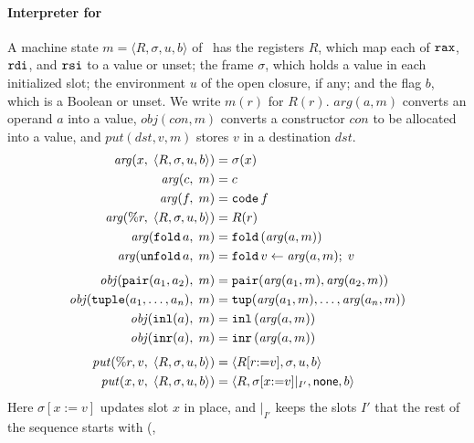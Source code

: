 \paragraph{Interpreter for \instr}

A machine state $m = \langle R, \sigma, u, b\rangle$ of \instr\ has
the registers $R$, which map each of $\mathtt{rax}$, $\mathtt{rdi}$, and
$\mathtt{rsi}$ to a value or unset; the frame $\sigma$, which holds a value
in each initialized slot; the environment $u$ of the open closure,
if any; and the flag $b$, which is a Boolean or unset. We write $m(r)$
for $R(r)$. $\mathit{arg}(a, m)$ converts an operand $a$ into a
value, $\mathit{obj}(\mathit{con}, m)$ converts a constructor $\mathit{con}$ to be allocated
into a value, and $\mathit{put}(\mathit{dst}, v, m)$ stores $v$ in a destination
$\mathit{dst}$.
\begin{align*}
  \mathit{arg}(x,\; \langle R, \sigma, u, b\rangle) &= \sigma(x) \\
  \mathit{arg}(c,\; m) &= c \\
  \mathit{arg}(f,\; m) &= \mathtt{code}\,f \\
  \mathit{arg}(\%r,\; \langle R, \sigma, u, b\rangle) &= R(r) \\
  \mathit{arg}(\mathtt{fold}\,a,\; m) &= \mathtt{fold}\,(\mathit{arg}(a, m)) \\
  \mathit{arg}(\mathtt{unfold}\,a,\; m) &= \mathtt{fold}\,v \leftarrow \mathit{arg}(a, m);\; v \\[4pt]
  \mathit{obj}(\mathtt{pair}(a_1, a_2),\; m) &= \mathtt{pair}(\mathit{arg}(a_1, m), \mathit{arg}(a_2, m)) \\
  \mathit{obj}(\mathtt{tuple}(a_1, \ldots, a_n),\; m) &= \mathtt{tup}(\mathit{arg}(a_1, m), \ldots, \mathit{arg}(a_n, m)) \\
  \mathit{obj}(\mathtt{inl}(a),\; m) &= \mathtt{inl}\,(\mathit{arg}(a, m)) \\
  \mathit{obj}(\mathtt{inr}(a),\; m) &= \mathtt{inr}\,(\mathit{arg}(a, m)) \\[4pt]
  \mathit{put}(\%r, v,\; \langle R, \sigma, u, b\rangle) &= \langle R[r{:=}v], \sigma, u, b\rangle \\
  \mathit{put}(x, v,\; \langle R, \sigma, u, b\rangle) &= \langle R, \sigma[x{:=}v]|_{I'}, \mathsf{none}, b\rangle
\end{align*}
Here $\sigma[x{:=}v]$ updates slot $x$ in place, and $|_{I'}$ keeps the
slots $I'$ that the rest of the sequence starts with (,
